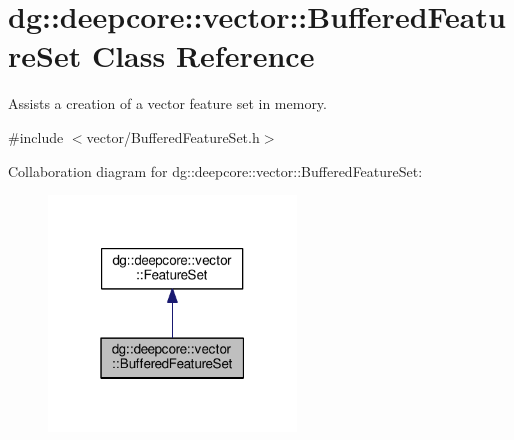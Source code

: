 \hypertarget{classdg_1_1deepcore_1_1vector_1_1_buffered_feature_set}{}\section{dg\+:\+:deepcore\+:\+:vector\+:\+:Buffered\+Feature\+Set Class Reference}
\label{classdg_1_1deepcore_1_1vector_1_1_buffered_feature_set}


Assists a creation of a vector feature set in memory.  




{\ttfamily \#include $<$vector/\+Buffered\+Feature\+Set.\+h$>$}



Collaboration diagram for dg\+:\+:deepcore\+:\+:vector\+:\+:Buffered\+Feature\+Set\+:
\nopagebreak
\begin{figure}[H]
\begin{center}
\leavevmode
\includegraphics[width=187pt]{classdg_1_1deepcore_1_1vector_1_1_buffered_feature_set__coll__graph}
\end{center}
\end{figure}
